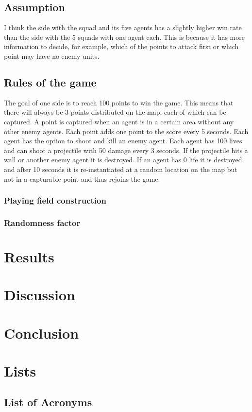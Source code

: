 \documentclass[]{report}
\begin{document}
\section{Assumption}
I think the side with the squad and its five agents has a slightly higher win rate than the side with the 5 squads with one agent each. This is because it has more information to decide, for example, which of the points to attack first or which point may have no enemy units. 

\section{Rules of the game}
The goal of one side is to reach 100 points to win the game. This means that there will always be 3 points distributed on the map, each of which can be captured. A point is captured when an agent is in a certain area without any other enemy agents. Each point adds one point to the score every 5 seconds. Each agent has the option to shoot and kill an enemy agent. Each agent has 100 lives and can shoot a projectile with 50 damage every 3 seconds. If the projectile hits a wall or another enemy agent it is destroyed. If an agent has 0 life it is destroyed and after 10 seconds it is re-instantiated at a random location on the map but not in a capturable point and thus rejoins the game.

\subsection{Playing field construction}
\subsection{Randomness factor}

\chapter{Results}
\chapter{Discussion}

\chapter{Conclusion}


\newpage
\chapter{Lists}
\section*{List of Acronyms}
\begin{acronym}[FOW]
	\end{acronym}

\listoffigures
\listoftables



\end{document}
